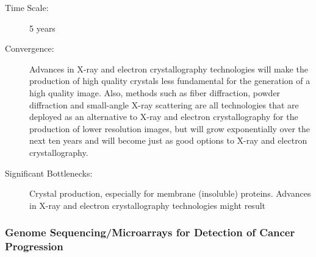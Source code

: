 \begin{description}
\item[Time Scale:] 5 years
 
\item[Convergence:] Advances in  X-ray and electron \gls{crystallography} technologies will make the production  of high quality crystals less fundamental for the generation of a high  quality image. Also, methods such as fiber diffraction, powder  diffraction and small-angle X-ray scattering are all technologies that  are deployed as an alternative to X-ray and electron \gls{crystallography} for  the production of lower resolution images, but will grow exponentially  over the next ten years and will become just as good options to X-ray  and electron \gls{crystallography}.
 
\item[Significant Bottlenecks:]  Crystal production, especially for membrane (insoluble) proteins.  Advances in X-ray and electron \gls{crystallography} technologies might result
   \end{description}
 
 
\subsubsection{Genome Sequencing/Microarrays for Detection of Cancer Progression}
 
